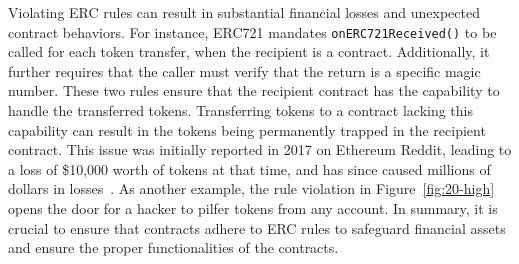 
Violating ERC rules can result in substantial financial losses and unexpected contract behaviors. For instance, ERC721 mandates \texttt{onERC721Received()} to be called for each token transfer, when the recipient is a contract. Additionally, it further requires that 
the caller must verify that the return is a specific magic number. 
These two rules ensure that the recipient contract has 
the capability to handle the transferred tokens. 
Transferring tokens to a contract lacking this capability can result 
in the tokens being permanently trapped in the recipient contract. 
This issue was initially reported in 2017 on Ethereum Reddit, 
leading to a loss of \$10,000 worth of tokens at that time, and has since caused millions of dollars in losses~\cite{erc20-problem-history}.
As another example, the rule violation in Figure~\ref{fig:20-high} 
opens the door for a hacker to
pilfer tokens from any account. 
In summary, it is crucial to ensure that contracts adhere to ERC rules to safeguard financial assets and 
ensure the proper functionalities of the contracts.



